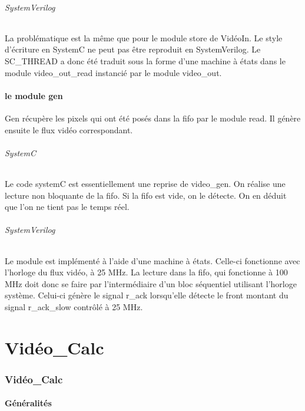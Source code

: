 \documentclass[a4paper,12pt]{report}
\begin{document}
{{\paragraph{SystemVerilog}
La problématique est la même que pour le module store de VidéoIn.
Le style d'écriture en SystemC ne peut pas être reproduit en SystemVerilog.
Le SC\_THREAD a donc été traduit sous la forme d'une machine à états dans le module video\_out\_read instancié par le module video\_out.

\subsection{le module gen}
Gen récupère les pixels qui ont été posés dans la fifo par le module read.
Il génère ensuite le flux vidéo correspondant.

\paragraph{SystemC}
Le code systemC est essentiellement une reprise de video\_gen.
On réalise une lecture non bloquante de la fifo.
Si la fifo est vide, on le détecte.
On en déduit que l'on ne tient pas le temps réel.

\paragraph{SystemVerilog}
Le module est implémenté à l'aide d'une machine à états.
Celle-ci fonctionne avec l'horloge du flux vidéo, à 25 MHz.
La lecture dans la fifo, qui fonctionne à 100 MHz doit donc se faire
par l'intermédiaire d'un bloc séquentiel utilisant l'horloge système.
Celui-ci génère le signal r\_ack lorsqu'elle détecte le front montant
du signal r\_ack\_slow contrôlé à 25 MHz.


    \part{Vidéo\_Calc}
    \section*{Vidéo\_Calc}

    \subsection{Généralités}

}}
\end{document}
